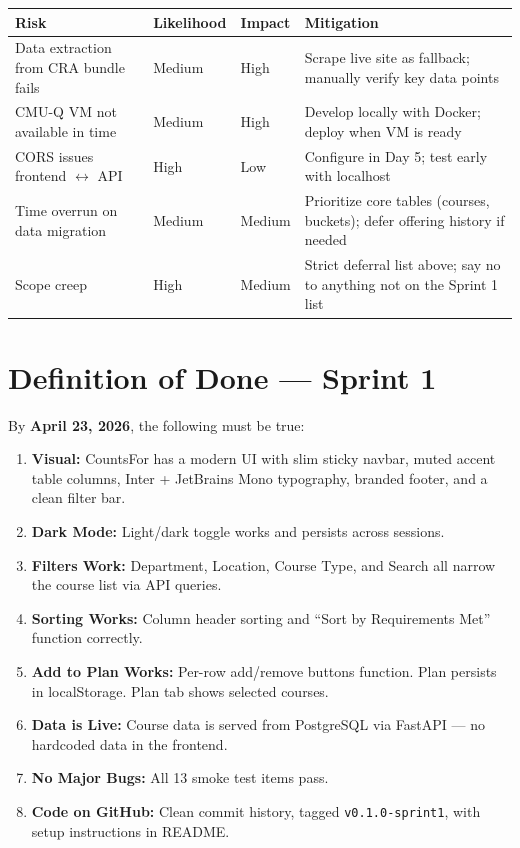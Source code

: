 \documentclass[11pt]{article}
\begin{document}
\begin{longtable}{p{} p{} p{} p{}}
\toprule
\textbf{Risk} & \textbf{Likelihood} & \textbf{Impact} & \textbf{Mitigation} \\
\midrule
Data extraction from CRA bundle fails & Medium & High & Scrape live site as fallback; manually verify key data points \\
CMU-Q VM not available in time & Medium & High & Develop locally with Docker; deploy when VM is ready \\
CORS issues frontend $\leftrightarrow$ API & High & Low & Configure in Day 5; test early with localhost \\
Time overrun on data migration & Medium & Medium & Prioritize core tables (courses, buckets); defer offering history if needed \\
Scope creep & High & Medium & Strict deferral list above; say no to anything not on the Sprint 1 list \\
\bottomrule
\end{longtable}

\section{Definition of Done — Sprint 1}

By \textbf{April 23, 2026}, the following must be true:

\begin{enumerate}[label=\textbf{\arabic*.}]
    \item \textbf{Visual:} CountsFor has a modern UI with slim sticky navbar, muted accent table columns, Inter + JetBrains Mono typography, branded footer, and a clean filter bar.
    \item \textbf{Dark Mode:} Light/dark toggle works and persists across sessions.
    \item \textbf{Filters Work:} Department, Location, Course Type, and Search all narrow the course list via API queries.
    \item \textbf{Sorting Works:} Column header sorting and ``Sort by Requirements Met'' function correctly.
    \item \textbf{Add to Plan Works:} Per-row add/remove buttons function. Plan persists in localStorage. Plan tab shows selected courses.
    \item \textbf{Data is Live:} Course data is served from PostgreSQL via FastAPI — no hardcoded data in the frontend.
    \item \textbf{No Major Bugs:} All 13 smoke test items pass.
    \item \textbf{Code on GitHub:} Clean commit history, tagged \texttt{v0.1.0-sprint1}, with setup instructions in README.
\end{enumerate}
\end{document}
